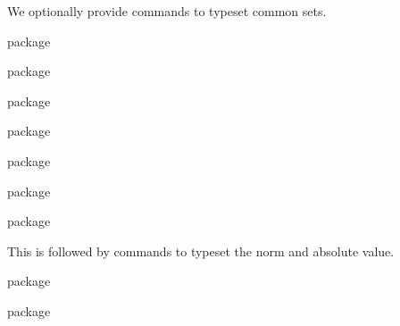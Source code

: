\documentclass[commonsets,load]{skdoc}
\begin{document}
  We optionally provide commands to typeset common sets.
\begin{MacroCode}{package}
\ifskmath@commonsets
\end{MacroCode}
  \begin{macro}{\N}
\begin{MacroCode}{package}
  \NewDocumentCommand{}
\end{MacroCode}
  \end{macro}
  \begin{macro}{\Z}
\begin{MacroCode}{package}
  \NewDocumentCommand{}
\end{MacroCode}
  \end{macro}
  \begin{macro}{\Q}
\begin{MacroCode}{package}
  \NewDocumentCommand{}
\end{MacroCode}
  \end{macro}
  \begin{macro}{\R}
\begin{MacroCode}{package}
  \NewDocumentCommand{}
\end{MacroCode}
  \end{macro}
  \begin{macro}{\C}
\begin{MacroCode}{package}
  \NewDocumentCommand{}
\end{MacroCode}
  \end{macro}
\begin{MacroCode}{package}
\fi
\end{MacroCode}
 
  This is followed by commands to typeset the norm and absolute value.
  \begin{macro}{\abs}
\begin{MacroCode}{package}
\DeclarePairedDelimiter\abs{\lvert}{\rvert}
\end{MacroCode}
  \end{macro}
  \begin{macro}{\norm}
\begin{MacroCode}{package}
\DeclarePairedDelimiter\norm{\lVert}{\rVert}
\end{MacroCode}
  \end{macro}
\end{document}

